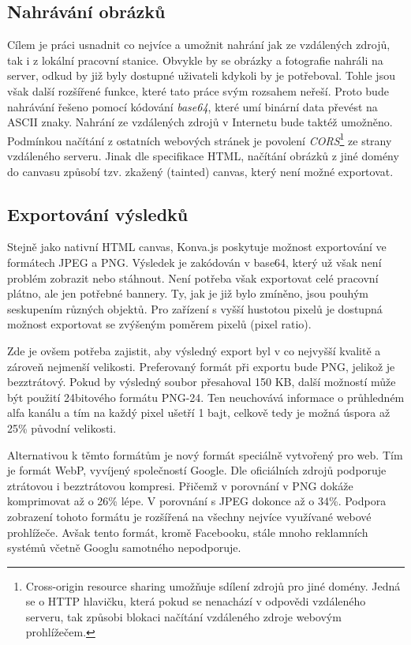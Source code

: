         \subsection{Nahrávání obrázků}
        Cílem je práci usnadnit co nejvíce a umožnit nahrání jak ze vzdálených zdrojů, tak i z lokální pracovní stanice.
        Obvykle by se obrázky a fotografie nahráli na server, odkud by již byly dostupné uživateli kdykoli by je potřeboval.
        Tohle jsou však další rozšířené funkce, které tato práce svým rozsahem neřeší. Proto bude nahrávání řešeno pomocí kódování \emph{base64},
        které umí binární data převést na ASCII znaky. Nahrání ze vzdálených zdrojů v Internetu bude taktéž umožněno. Podmínkou načítání z ostatních webových stránek
        je povolení \emph{CORS}\footnote{Cross-origin resource sharing umožňuje sdílení zdrojů pro jiné domény. Jedná se o HTTP hlavičku, která pokud se nenachází v odpovědi vzdáleného serveru, tak způsobi blokaci načítání vzdáleného zdroje webovým prohlížečem.} ze strany vzdáleného serveru. Jinak dle specifikace HTML, načítání obrázků z jiné domény do canvasu 
        způsobí tzv. zkažený (tainted) canvas, který není možné exportovat.

        \subsection{Exportování výsledků}
        Stejně jako nativní HTML canvas, Konva.js poskytuje možnost exportování ve formátech JPEG a PNG.
        Výsledek je zakódován v base64, který už však není problém zobrazit nebo stáhnout.
        Není potřeba však exportovat celé pracovní plátno, ale jen potřebné bannery. Ty, jak je již bylo zmíněno,
        jsou pouhým seskupením různých objektů. Pro zařízení s vyšší hustotou pixelů je dostupná možnost exportovat se zvýšeným poměrem pixelů (pixel ratio). 

        Zde je ovšem potřeba zajistit, aby výsledný export byl v co nejvyšší kvalitě a zároveň nejmenší velikosti.
        Preferovaný formát při exportu bude PNG, jelikož je bezztrátový. Pokud by výsledný soubor přesahoval 150 KB,
        další možností může být použití 24bitového formátu PNG-24.
        Ten neuchovává informace o průhledném alfa kanálu a tím na každý pixel ušetří 1 bajt, celkově tedy je možná úspora až 25\% původní velikosti. 

        Alternativou k těmto formátům je nový formát speciálně vytvořený pro web. Tím je formát WebP, vyvíjený společností Google.
        Dle oficiálních zdrojů podporuje ztrátovou i bezztrátovou kompresi. Přičemž v porovnání v PNG dokáže komprimovat až o 26\% lépe. V porovnání
        s JPEG dokonce až o 34\%. Podpora zobrazení tohoto formátu je rozšířená na všechny nejvíce využívané webové prohlížeče.
        Avšak tento formát, kromě Facebooku, stále mnoho reklamních systémů včetně Googlu samotného nepodporuje.

